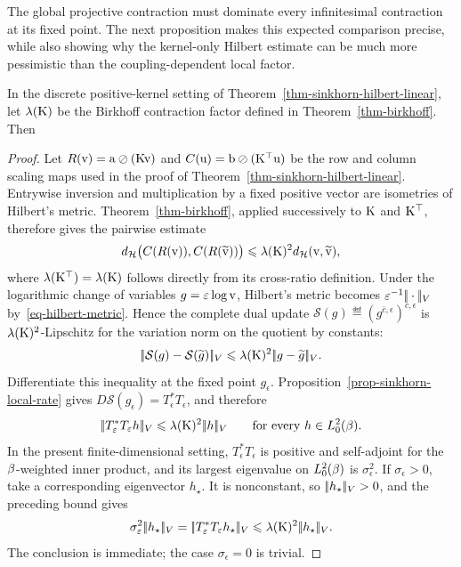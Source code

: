 The global projective contraction must dominate every infinitesimal contraction at its fixed point. The next proposition makes this expected comparison precise, while also showing why the kernel-only Hilbert estimate can be much more pessimistic than the coupling-dependent local factor.

\begin{prop}\label{prop-sinkhorn-hilbert-controls-local}
	In the discrete positive-kernel setting of Theorem~\ref{thm-sinkhorn-hilbert-linear}, let $\lambda(\mathrm{K})$ be the Birkhoff contraction factor defined in Theorem~\ref{thm-birkhoff}. Then
\end{prop}
\begin{proof}
	Let $R(\mathrm{v})=\mathrm{a}\oslash(\mathrm{K}\mathrm{v})$ and $C(\mathrm{u})=\mathrm{b}\oslash(\mathrm{K}^\top\mathrm{u})$ be the row and column scaling maps used in the proof of Theorem~\ref{thm-sinkhorn-hilbert-linear}. Entrywise inversion and multiplication by a fixed positive vector are isometries of Hilbert's metric. Theorem~\ref{thm-birkhoff}, applied successively to $\mathrm{K}$ and $\mathrm{K}^\top$, therefore gives the pairwise estimate
	\[
		d_{\mathcal{H}}\bigl(C(R(\mathrm{v})),C(R(\widetilde{\mathrm{v}}))\bigr)
		\leqslant
		\lambda(\mathrm{K})^2d_{\mathcal{H}}(\mathrm{v},\widetilde{\mathrm{v}}),
	\]
	where $\lambda(\mathrm{K}^\top)=\lambda(\mathrm{K})$ follows directly from its cross-ratio definition. Under the logarithmic change of variables $g=\varepsilon\log\mathrm{v}$, Hilbert's metric becomes $\varepsilon^{-1}|\!| \cdot |\!|_V$ by~\eqref{eq-hilbert-metric}. Hence the complete dual update
	\(
		\mathcal S(g)\eqdef(g^{\bar c,\epsilon})^{c,\epsilon}
	\)
	is $\lambda(\mathrm{K})^2$-Lipschitz for the variation norm on the quotient by constants:
	\[
		|\!| \mathcal S(g)-\mathcal S(\widetilde g) |\!|_V
		\leqslant
		\lambda(\mathrm{K})^2|\!| g-\widetilde g |\!|_V.
	\]
	Differentiate this inequality at the fixed point $g_\epsilon$. Proposition~\ref{prop-sinkhorn-local-rate} gives
	\(D\mathcal S(g_\epsilon)=T_\epsilon^*T_\epsilon\), and therefore
	\[
		|\!| T_\varepsilon^*T_\varepsilon h |\!|_V
		\leqslant
		\lambda(\mathrm{K})^2|\!| h |\!|_V
		\qquad
		\text{for every }h\in L_0^2(\beta).
	\]
	In the present finite-dimensional setting, $T_\epsilon^*T_\epsilon$ is positive and self-adjoint for the $\beta$-weighted inner product, and its largest eigenvalue on $L_0^2(\beta)$ is $\sigma_\epsilon^2$. If $\sigma_\epsilon>0$, take a corresponding eigenvector $h_\star$. It is nonconstant, so $|\!| h_\star |\!|_V>0$, and the preceding bound gives
	\[
		\sigma_\varepsilon^2|\!| h_\star |\!|_V
		=
		|\!| T_\varepsilon^*T_\varepsilon h_\star |\!|_V
		\leqslant
		\lambda(\mathrm{K})^2|\!| h_\star |\!|_V.
	\]
	The conclusion is immediate; the case $\sigma_\epsilon=0$ is trivial.
\end{proof}

